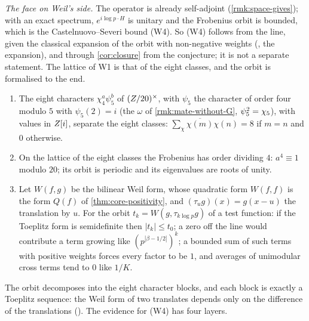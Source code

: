 \emph{The face on Weil's side.}  The operator is already self-adjoint (\cref{rmk:space-gives}); with
an exact spectrum, $e^{i\log p\cdot H}$ is unitary and the Frobenius orbit is bounded, which is the
Castelnuovo--Severi bound (W4).  So (W4) follows from
the line, given the classical expansion of the orbit
with non-negative weights
(, the expansion), and through
\cref{cor:closure} from the conjecture; it is not a
separate statement.
  The lattice of W1 is that of the eight classes, and the orbit is formalised to the
end.

\begin{proposition}\label{prop:eight-classes}
\begin{enumerate}[label=\textup{(\roman*)}]
  \item The eight characters $\chi_4^a\psi_5^b$ of $(Z/20)^\times$, with $\psi_5$ the character of order four modulo $5$ with $\psi_5(2)=i$ (the $\omega$ of \cref{rmk:mate-without-G}, $\psi_5^2=\chi_5$), with values in
    $Z[i]$, separate the eight classes: $\sum_\chi\overline{\chi(m)}\chi(n)=8$ if $m=n$ and $0$ otherwise.
  \item On the lattice of the eight classes the Frobenius has order dividing $4$: $a^4\equiv1$
    modulo $20$; its orbit is periodic and its eigenvalues are roots of unity.
  \item Let $W(f,g)$ be the bilinear Weil form, whose quadratic form $W(f,f)$ is the form $Q(f)$ of \cref{thm:core-positivity},
    and $(\tau_ug)(x)=g(x-u)$ the translation by $u$.  For the orbit $t_k=W(g,\tau_{k\log p}g)$ of a test function: if the Toeplitz form is
    semidefinite then $|t_k|\le t_0$; a zero off the line would contribute a term growing like
    $(p^{|\beta-1/2|})^k$; a bounded sum of such terms with positive weights forces every factor
    to be $1$, and averages of unimodular cross terms tend to $0$ like $1/K$.
\end{enumerate}

\end{proposition}

The orbit decomposes into the eight character blocks, and each block is exactly a Toeplitz
sequence: the Weil form of two translates depends only on the difference of the translations
().  The evidence for
(W4) has four layers.

